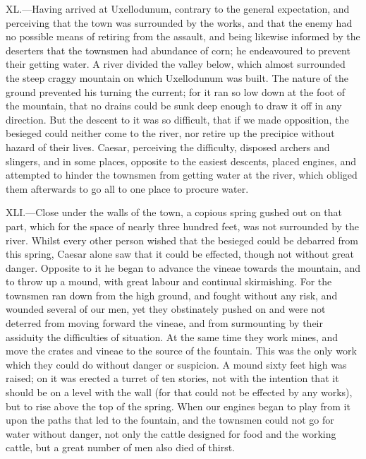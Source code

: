 XL.—Having arrived at Uxellodunum, contrary to the general expectation,
and perceiving that the town was surrounded by the works, and that the
enemy had no possible means of retiring from the assault, and being
likewise informed by the deserters that the townsmen had abundance of
corn; he endeavoured to prevent their getting water. A river divided the
valley below, which almost surrounded the steep craggy mountain on which
Uxellodunum was built. The nature of the ground prevented his turning
the current; for it ran so low down at the foot of the mountain, that no
drains could be sunk deep enough to draw it off in any direction. But
the descent to it was so difficult, that if we made opposition, the
besieged could neither come to the river, nor retire up the precipice
without hazard of their lives. Caesar, perceiving the difficulty,
disposed archers and slingers, and in some places, opposite to the
easiest descents, placed engines, and attempted to hinder the townsmen
from getting water at the river, which obliged them afterwards to go all
to one place to procure water.

XLI.—Close under the walls of the town, a copious spring gushed out on
that part, which for the space of nearly three hundred feet, was not
surrounded by the river. Whilst every other person wished that the
besieged could be debarred from this spring, Caesar alone saw that it
could be effected, though not without great danger. Opposite to it he
began to advance the vineae towards the mountain, and to throw up a
mound, with great labour and continual skirmishing. For the townsmen ran
down from the high ground, and fought without any risk, and wounded
several of our men, yet they obstinately pushed on and were not deterred
from moving forward the vineae, and from surmounting by their assiduity
the difficulties of situation. At the same time they work mines, and
move the crates and vineae to the source of the fountain. This was the
only work which they could do without danger or suspicion. A mound sixty
feet high was raised; on it was erected a turret of ten stories, not
with the intention that it should be on a level with the wall (for that
could not be effected by any works), but to rise above the top of the
spring. When our engines began to play from it upon the paths that led
to the fountain, and the townsmen could not go for water without danger,
not only the cattle designed for food and the working cattle, but a
great number of men also died of thirst.


